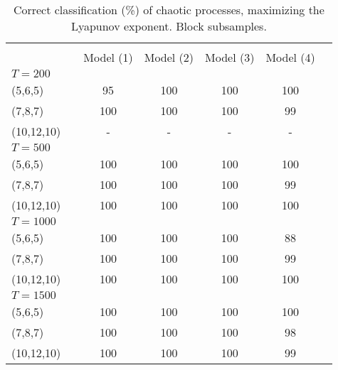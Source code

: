 \documentclass[12pt]{article}
\begin{document}
\begin{table} [H]\scriptsize
    \caption{ Correct classification (\%) of chaotic processes, maximizing the Lyapunov exponent. Block subsamples.}
    \begin{tabular*}{\textwidth}{@{\extracolsep{\fill}}lcccccc}
        \hline &  &  &  & &   \\ 
          &  &  Model (1) & Model (2)  & Model (3) & Model (4)  \\ 
        $T=200$  &  &  &  & &  & \\
        (5,6,5)                           &  & 95   & 100  & 100 &  100  \\ 
        (7,8,7)                           &  & 100  & 100  & 100 &  99  \\ 
        (10,12,10)                        &  & -    &  -   &  -  &  - \\ 
        \hline 
         $T=500$  &  &   & & &    \\ 

        (5,6,5)                           &  & 100 & 100 & 100 & 100  \\ 
        (7,8,7)                           &  & 100 & 100 & 100 & 99 \\ 
        (10,12,10)                        &  & 100 & 100 & 100 & 100 \\ 
\hline 
         $T=1000$  &  &   &   &  &    \\ 

        (5,6,5)                           &  & 100 & 100 & 100   & 88  \\ 
        (7,8,7)                           &  & 100 & 100 & 100   & 99 \\ 
        (10,12,10)                        &  & 100 & 100 & 100   & 100 \\ 
\hline      
         $T=1500$  &  &   &   &  &   \\ 

        (5,6,5)                           &  & 100 & 100 &  100  &  100  \\ 
        (7,8,7)                           &  & 100 & 100 &  100  &  98 \\ 
        (10,12,10)                        &  & 100 & 100 &  100  &  99 \\ 
\hline      
    \end{tabular*}
\end{table}
\end{document}
